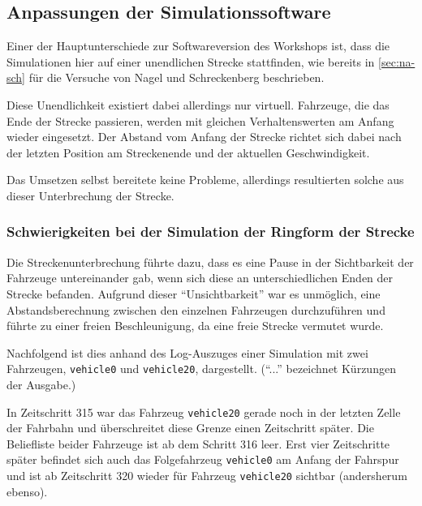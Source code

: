 


\subsection{Anpassungen der Simulationssoftware}
\label{sec:anpassungen-probleme}

Einer der Hauptunterschiede zur Softwareversion des Workshops ist, dass die Simulationen hier auf einer unendlichen Strecke stattfinden, wie bereits in \cref{sec:na-sch} für die Versuche von Nagel und Schreckenberg beschrieben.

Diese Unendlichkeit existiert dabei allerdings nur virtuell.
Fahrzeuge, die das Ende der Strecke passieren, werden mit gleichen Verhaltenswerten am Anfang wieder eingesetzt.
Der Abstand vom Anfang der Strecke richtet sich dabei nach der letzten Position am Streckenende und der aktuellen Geschwindigkeit.

Das Umsetzen selbst bereitete keine Probleme, allerdings resultierten solche aus dieser Unterbrechung der Strecke.



\subsubsection{Schwierigkeiten bei der Simulation der Ringform der Strecke}
\label{sec:probleme-ringform}

Die Streckenunterbrechung führte dazu, dass es eine Pause in der Sichtbarkeit der Fahrzeuge untereinander gab, wenn sich diese an unterschiedlichen Enden der Strecke befanden.
Aufgrund dieser \enquote{Unsichtbarkeit} war es unmöglich, eine Abstandsberechnung zwischen den einzelnen Fahrzeugen durchzuführen und führte zu einer freien Beschleunigung, da eine freie Strecke vermutet wurde.

Nachfolgend ist dies anhand des Log-Auszuges einer Simulation mit zwei Fahrzeugen, \texttt{vehicle0} und \texttt{vehicle20}, dargestellt. 
(\enquote{...} bezeichnet Kürzungen der Ausgabe.)

In Zeitschritt 315 war das Fahrzeug \texttt{vehicle20} gerade noch in der letzten Zelle der Fahrbahn und überschreitet diese Grenze einen Zeitschritt später.
Die Beliefliste beider Fahrzeuge ist ab dem Schritt 316 leer.
Erst vier Zeitschritte später befindet sich auch das Folgefahrzeug \texttt{vehicle0} am Anfang der Fahrspur und ist ab Zeitschritt 320 wieder für Fahrzeug \texttt{vehicle20} sichtbar (andersherum ebenso).

